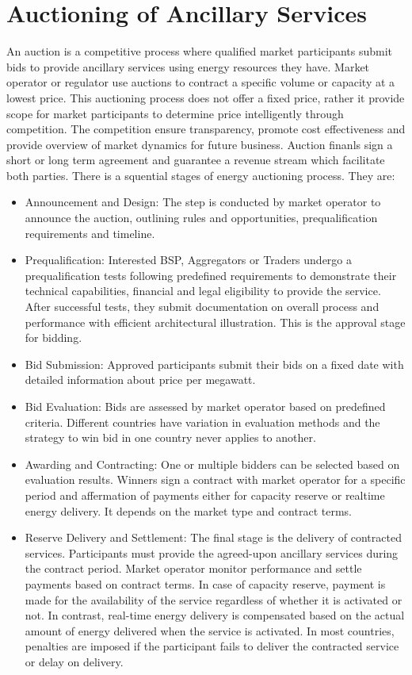 \section{Auctioning of Ancillary Services}
An auction is a competitive process where qualified market participants submit bids to provide ancillary services using energy resources they have. Market operator or regulator use auctions to contract a specific volume or capacity at a lowest price. This auctioning process does not offer a fixed price, rather it provide scope for market participants to determine price intelligently through competition. The competition ensure transparency, promote cost effectiveness and provide overview of market dynamics for future business. Auction finanls sign a short or long term agreement and guarantee a revenue stream which facilitate both parties. There is a squential stages of energy auctioning process. They are:
    \begin{itemize}
        \item Announcement and Design: The step is conducted by market operator to announce the auction, outlining rules and opportunities, prequalification requirements and timeline. 
        \item Prequalification: Interested BSP, Aggregators or Traders undergo a prequalification tests following predefined requirements to demonstrate their technical capabilities, financial and legal eligibility to provide the service. After successful tests, they submit documentation on overall process and performance with efficient architectural illustration. This is the approval stage for bidding.
        \item Bid Submission: Approved participants submit their bids on a fixed date with detailed information about price per megawatt. 
        \item Bid Evaluation: Bids are assessed by market operator based on predefined criteria. Different countries have variation in evaluation methods and the strategy to win bid in one country never applies to another. 
        \item Awarding and Contracting: One or multiple bidders can be selected based on evaluation results. Winners sign a contract with market operator for a specific period and affermation of payments either for capacity reserve or realtime energy delivery. It depends on the market type and contract terms.
        \item Reserve Delivery and Settlement: The final stage is the delivery of contracted services. Participants must provide the agreed-upon ancillary services during the contract period. Market operator monitor performance and settle payments based on contract terms. In case of capacity reserve, payment is made for the availability of the service regardless of whether it is activated or not. In contrast, real-time energy delivery is compensated based on the actual amount of energy delivered when the service is activated. In most countries, penalties are imposed if the participant fails to deliver the contracted service or delay on delivery.
    \end{itemize}
